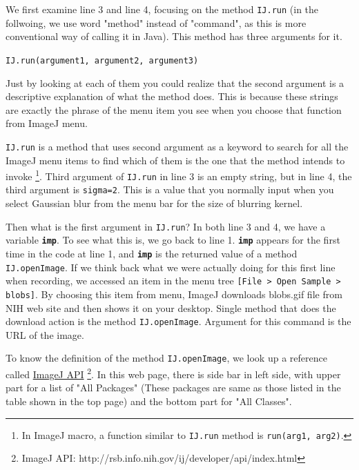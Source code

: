 \documentclass[11pt,a4paper,oneside]{report}
\newcommand{\ijmenu}[1]{\texttt{\small#1}}
\newcommand{\ilcom}[1]{\texttt{\small#1}}
\begin{document}
%


We first examine line 3 and line 4, focusing on the method \ilcom{IJ.run}  
(in the follwoing, we use word "method" instead of "command", as this is more 
conventional way of calling it in Java). This method has three arguments for it.

\ilcom{IJ.run(argument1, argument2, argument3)}

 Just by looking at each of them you could realize that the second argument 
 is a descriptive explanation of what the method does. 
 This is because these strings are exactly the phrase of the menu item you see 
 when you choose that function from ImageJ menu. 

\ilcom{IJ.run} is a method that uses second argument as a keyword 
to search for all the ImageJ menu items to find which of them is the one 
that the method intends to invoke 
\footnote{In ImageJ macro, a function similar to \ilcom{IJ.run} 
method is \ilcom{run(arg1, arg2)}.}. 
Third argument of \ilcom{IJ.run} in line 3 is an empty string, 
but in line 4, the third argument is \ilcom{sigma=2}. 
This is a value that you normally input when you select Gaussian blur 
from the menu bar for the size of blurring kernel. 

Then what is the first argument in \ilcom{IJ.run}? 
In both line 3 and 4, we have a variable \textbf{\ilcom{imp}}. 
To see what this is, we go back to line 1. 
\textbf{\ilcom{imp}} appears for the first time in the code at line 1, 
and \textbf{\ilcom{imp}} is the returned value of a method \ilcom{IJ.openImage}. 
If we think back what we were actually doing for this first line when recording, 
we accessed an item in the menu tree \ijmenu{[File > Open Sample > blobs]}. 
By choosing this item from menu, ImageJ downloads blobs.gif file from NIH web site 
and then shows it on your desktop. 
Single method that does the download action is the method \ilcom{IJ.openImage}. 
Argument for this command is the URL of the image. 

To know the definition of the method \ilcom{IJ.openImage}, 
we look up a reference called 
\href{http://rsb.info.nih.gov/ij/developer/api/index.html}{ImageJ API}
\footnote{ ImageJ API: http://rsb.info.nih.gov/ij/developer/api/index.html}. 
In this web page, there is side bar in left side, with upper part 
for a list of "All Packages" 
(These packages are same as those listed in the table shown in the top page) 
and the bottom part for "All Classes".  
\end{document}
